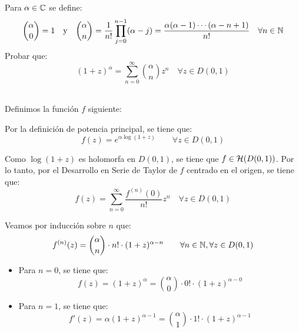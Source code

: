 \begin{ejercicio}\label{ej:8.2}
    Para $\alpha \in \mathbb{C}$ se define:
    \begin{equation*}
        \binom{\alpha}{0} = 1 \quad \text{y} \quad \binom{\alpha}{n} = \frac{1}{n!} \prod_{j=0}^{n-1} (\alpha-j) = \frac{\alpha(\alpha-1)\cdots(\alpha-n+1)}{n!} \quad \forall n \in \mathbb{N}
    \end{equation*}
    Probar que:
    \begin{equation*}
        (1+z)^{\alpha} = \sum_{n=0}^{\infty} \binom{\alpha}{n} z^n \quad \forall z \in D(0,1)
    \end{equation*}~

    Definimos la función $f$ siguiente:

    Por la definición de potencia principal, se tiene que:
    \begin{equation*}
        f(z) = e^{\alpha \log(1+z)}\qquad \forall z \in D(0,1)
    \end{equation*}

    Como $\log(1+z)$ es holomorfa en $D(0,1)$, se tiene que $f\in \mathcal{H}(D(0,1))$. Por lo tanto, por el Desarrollo en Serie de Taylor de $f$ centrado en el origen, se tiene que:
    \begin{equation*}
        f(z) = \sum_{n=0}^{\infty} \frac{f^{(n)}(0)}{n!} z^n \quad \forall z \in D(0,1)
    \end{equation*}

    Veamos por inducción sobre $n$ que:
    \begin{equation*}
        f^{(n)}(z) = \binom{\alpha}{n}\cdot n!\cdot (1+z)^{\alpha-n} \qquad \forall n \in \mathbb{N}, \forall z \in D(0,1)
    \end{equation*}
    \begin{itemize}
        \item Para $n=0$, se tiene que:
        \begin{equation*}
            f(z) = (1+z)^{\alpha} = \binom{\alpha}{0}\cdot 0!\cdot (1+z)^{\alpha-0}
        \end{equation*}

        \item Para $n=1$, se tiene que:
        \begin{equation*}
            f'(z) = \alpha(1+z)^{\alpha-1} = \binom{\alpha}{1}\cdot 1!\cdot (1+z)^{\alpha-1}
        \end{equation*}


\end{itemize}
\end{ejercicio}
